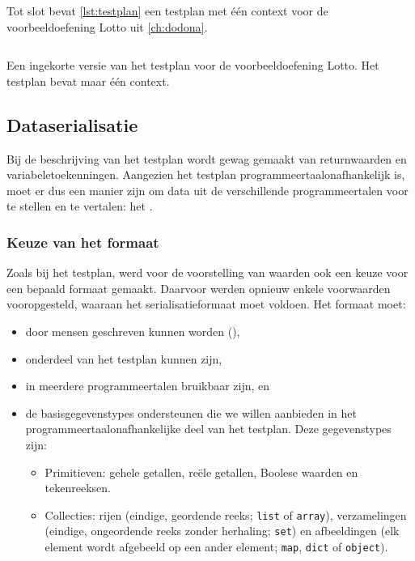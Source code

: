 Tot slot bevat \cref{lst:testplan} een testplan met één context voor de voorbeeldoefening Lotto uit \cref{ch:dodona}.

\begin{listing}
    \inputminted{python}{code/testplan.json}
    \caption{
        Een ingekorte versie van het testplan voor de voorbeeldoefening Lotto.
        Het testplan bevat maar één context.
    }
    \label{lst:testplan}
\end{listing}

\subsection{Dataserialisatie}\label{subsec:dataserialisatie}

Bij de beschrijving van het testplan wordt gewag gemaakt van returnwaarden en variabeletoekenningen.
Aangezien het testplan programmeertaalonafhankelijk is, moet er dus een manier zijn om data uit de verschillende programmeertalen voor te stellen en te vertalen: het .

\subsubsection{Keuze van het formaat}

Zoals bij het testplan, werd voor de voorstelling van waarden ook een keuze voor een bepaald formaat gemaakt.
Daarvoor werden opnieuw enkele voorwaarden vooropgesteld, waaraan het serialisatieformaat moet voldoen.
Het formaat moet:

\begin{itemize}
    \item door mensen geschreven kunnen worden (),
    \item onderdeel van het testplan kunnen zijn,
    \item in meerdere programmeertalen bruikbaar zijn, en
    \item de basisgegevenstypes ondersteunen die we willen aanbieden in het programmeertaalonafhankelijke deel van het testplan.
    Deze gegevenstypes zijn:
    \begin{itemize}
        \item Primitieven: gehele getallen, reële getallen, Boolese waarden en tekenreeksen.
        \item Collecties: rijen (eindige, geordende reeks; \texttt{list} of \texttt{array}), verzamelingen (eindige, ongeordende reeks zonder herhaling; \texttt{set}) en afbeeldingen (elk element wordt afgebeeld op een ander element; \texttt{map}, \texttt{dict} of \texttt{object}).
    \end{itemize}
\end{itemize}

